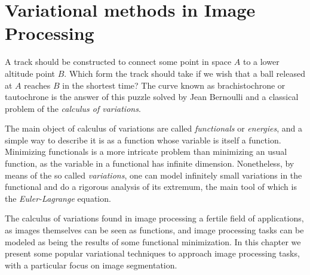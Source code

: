 \chapter{Variational methods in Image Processing}
\label{chapter:variational-methods-in-image-processing}

A track should be constructed to connect some point in space $A$ to a lower altitude point $B$. Which form the track should take if we wish that a ball released at $A$ reaches $B$ in the shortest time? The curve known as brachistochrone or tautochrone is the answer of this puzzle solved by Jean Bernoulli and a classical problem of the \emph{calculus of variations}. 

The main object of calculus of variations are called \emph{functionals} or \emph{energies}, and a simple way to describe it is as a function whose variable is itself a function. Minimizing functionals is a more intricate problem than minimizing an usual function, as the variable in a functional has infinite dimension. Nonetheless, by means of the so called \emph{variations}, one can model infinitely small variations in the functional and do a rigorous analysis of its extremum, the main tool of which is the \emph{Euler-Lagrange} equation.

The calculus of variations found in image processing a fertile field of applications, as images themselves can be seen as functions, and image processing tasks can be modeled as being the results of some functional minimization. In this chapter we present some popular variational techniques to approach image processing tasks, with a particular focus on image segmentation. 


